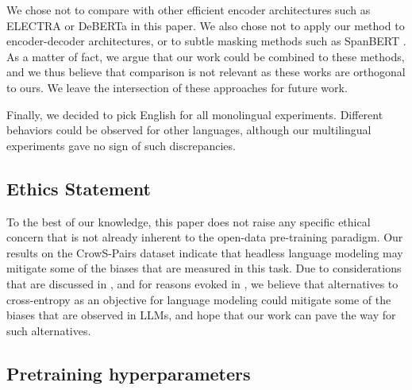 We chose not to compare with other efficient encoder architectures such as ELECTRA or DeBERTa in this paper. We also chose not to apply our method to encoder-decoder architectures, or to subtle masking methods such as SpanBERT \citep{joshi-etal-2020-spanbert}. As a matter of fact, we argue that our work could be combined to these methods, and we thus believe that comparison is not relevant as these works are orthogonal to ours. We leave the intersection of these approaches for future work.

Finally, we decided to pick English for all monolingual experiments. Different behaviors could be observed for other languages, although our multilingual experiments gave no sign of such discrepancies.

\subsection{Ethics Statement}
To the best of our knowledge, this paper does not raise any specific ethical concern that is not already inherent to the open-data pre-training paradigm. Our results on the CrowS-Pairs dataset indicate that headless language modeling may mitigate some of the biases that are measured in this task. Due to considerations that are discussed in \citet{zhou2021frequencybased}, and for reasons evoked in , we believe that alternatives to cross-entropy as an objective for language modeling could mitigate some of the biases that are observed in LLMs, and hope that our work can pave the way for such alternatives.

\subsection{Pretraining hyperparameters}
\label{app:train_hp}

